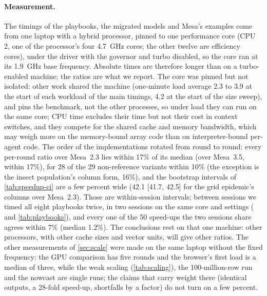 \paragraph{Measurement.} The timings of the playbooks, the migrated models and Mesa's examples come from
one laptop with a hybrid processor, pinned to one performance
core (CPU 2, one of the processor's four 4.7~GHz
cores; the other twelve are efficiency cores), under the  driver with the
 governor and turbo disabled, so the core ran at its 1.9~GHz base frequency.
Absolute times are therefore longer than on a turbo-enabled machine; the ratios are what we
report. The core was pinned but not isolated: other work shared the machine (one-minute load
average 2.3 to 3.9 at the start of each workload of the main timings, 4.2 at the start of the
size sweep), and  pins the benchmark, not the other processes, so under load
they can run on the same core; CPU time excludes their time but not their cost in context
switches, and they compete for the shared cache and memory bandwidth, which may weigh more on the
memory-bound array code than on interpreter-bound per-agent code. The order of the
implementations rotated from round to round: every per-round ratio over Mesa~2.3 lies within
17\% of its median (over Mesa~3.5, within 17\%), for 28 of the 29 non-reference variants
within 10\% (the exception is the insect population's column form, 16\%), and the bootstrap
intervals of \cref{tab:speedup-ci} are a few percent wide (42.1 [41.7, 42.5] for the grid
epidemic's columns over Mesa~2.3). Those are within-session intervals; between sessions we timed all
eight playbooks twice, in two sessions on the same core and settings
( and \cref{tab:playbooks}), and every one of the 50 speed-ups the two
sessions share agrees within 7\% (median 1.2\%). The conclusions rest on that one machine: other processors, with other cache sizes and
vector units, will give other ratios. The other measurements of \cref{sec:scale} were
made on the same laptop without the fixed frequency: the GPU comparison has five rounds and
the browser's first load is a median of three, while the weak scaling (\cref{tab:scaling}),
the 100-million-row run and the nowcast are single runs; the claims that carry weight there
(identical outputs, a 28-fold speed-up, shortfalls by a factor) do not turn on a few percent.

